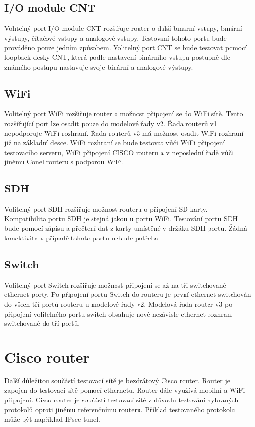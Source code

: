 \subsection{I/O module CNT}
Volitelný port I/O module CNT rozšiřuje router o další binární vstupy, binární výstupy, čítačové vstupy a analogové vstupy. Testování tohoto portu bude prováděno pouze jedním způsobem. Volitelný port CNT se bude testovat pomocí loopback desky CNT, která podle nastavení binárního vstupu postupně dle známého postupu nastavuje svoje binární a analogové výstupy.

\subsection{WiFi}
Volitelný port WiFi rozšiřuje router o možnost připojení se do WiFi sítě. Tento rozšiřující port lze osadit pouze do modelové řady v2. Řada routerů v1 nepodporuje WiFi rozhraní. Řada routerů v3 má možnost osadit WiFi rozhraní již na základní desce. WiFi rozhraní se bude testovat vůči WiFi připojení testovacího serveru, WiFi připojení CISCO routeru a v neposlední řadě vůči jinému Conel routeru s podporou WiFi.

\subsection{SDH}
Volitelný port SDH rozšiřuje možnost routeru o připojení SD karty. Kompatibilita portu SDH je stejná jakou u portu WiFi. Testování portu SDH bude pomocí zápisu a přečtení dat z karty umístěné v držáku SDH portu. Žádná konektivita v případě tohoto portu nebude potřeba.

\subsection{Switch}
Volitelný port Switch rozšiřuje možnost připojení se až na tři switchované ethernet porty. Po připojení portu Switch do routeru je první ethernet switchován do všech tří portů routeru u modelové řady v2. Modelová řada router v3 po připojení volitelného portu switch obsahuje nové nezávisle ethernet rozhraní switchované do tří portů.

\section{Cisco router}
Další důležitou součástí testovací sítě je bezdrátový Cisco router. Router je zapojen do testovací sítě pomocí ethernetu. Router dále využívá mobilní a WiFi připojení. Cisco router je součástí testovací sítě z důvodu testování vybraných protokolů oproti jinému referenčnímu routeru. Příklad testovaného protokolu může být například IPsec tunel.

